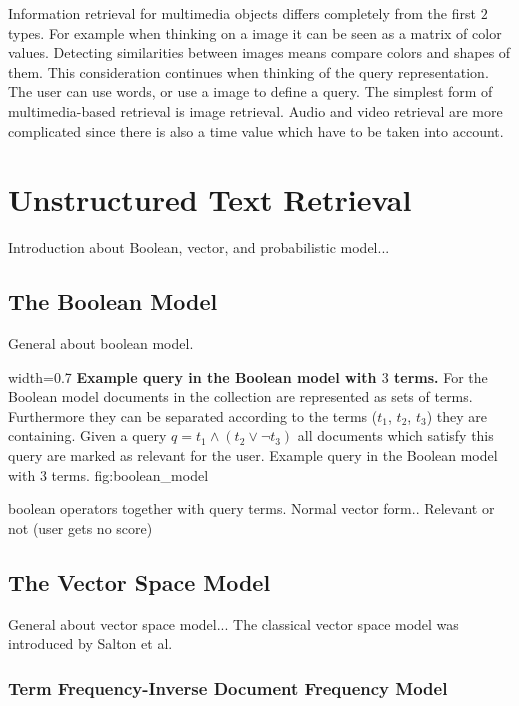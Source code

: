 Information retrieval for multimedia objects differs completely from the first $2$ types. For example when thinking on a image it can be seen as a matrix of color values. Detecting similarities between images means compare colors and shapes of them. This consideration continues when thinking of the query representation. The user can use words, or use a image to define a query. The simplest form of multimedia-based retrieval is image retrieval. Audio and video retrieval are more complicated since there is also a time value which have to be taken into account.

\section{Unstructured Text Retrieval}
\label{sec:unstructured_text_Retrieval}



Introduction about Boolean, vector, and probabilistic model...

\subsection{The Boolean Model}
\label{sec:the_boolean_model}

General about boolean model.

      {width=0.7\textwidth}
      {\textbf{Example query in the Boolean model with $3$ terms.} For the Boolean model documents in the collection are represented as sets of terms. Furthermore they can be separated according to the terms ($t_1$, $t_2$, $t_3$) they are containing. Given a query $q=t_1 \wedge (t_2 \vee \neg t_3)$ all documents which satisfy this query are marked as relevant for the user.}
      {Example query in the Boolean model with $3$ terms.}
      {fig:boolean_model}

boolean operators together with query terms. Normal vector form..
Relevant or not (user gets no score)

\subsection{The Vector Space Model}
\label{sec:the_vector_space_model}

General about vector space model... The classical vector space model was introduced by Salton et al.~\cite{salton75vsm}

\subsubsection{Term Frequency-Inverse Document Frequency Model}
\label{sec:tfidf}

